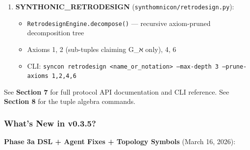 \documentclass[12pt,a4paper]{article}
\begin{document}
\begin{enumerate}
    \item 
    \textbf{SYNTHONIC\_RETRODESIGN} (\texttt{synthomnicon/retrodesign.py}):

    \begin{itemize}
    \item \texttt{RetrodesignEngine.decompose()} --- recursive axiom-pruned decomposition tree
    \item Axioms 1, 2 (sub-tuples claiming G\_ℵ only), 4, 6
    \item CLI: \texttt{syncon retrodesign \textless{}name\_or\_notation\textgreater{} --max-depth 3 --prune-axioms 1,2,4,6}
\end{itemize}

\end{enumerate}

See \textbf{Section 7} for full protocol API documentation and CLI reference. See \textbf{Section 8} for the tuple algebra commands.

\subsubsection{What's New in v0.3.5?}

\textbf{Phase 3a DSL + Agent Fixes + Topology Symbols} (March 16, 2026):
\end{document}
